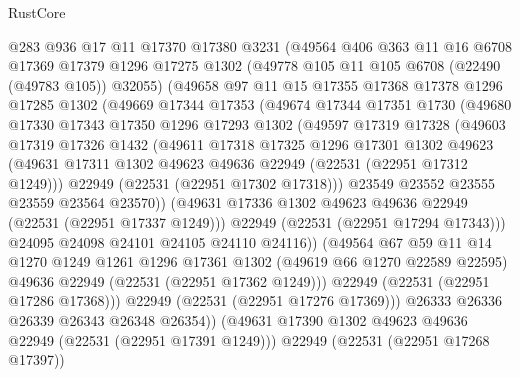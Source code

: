 \begin{lexlean}{RustCore}
\begin{coremodule}
        @283
        @936
        @17
        @11
        @17370
        @17380
        @3231
        (@49564
          @406
          @363
          @11
          @16
          @6708
          @17369
          @17379
          @1296
          @17275
          @1302
          (@49778 @105 @11 @105 @6708 (@22490 (@49783 @105)) @32055)
          (@49658
            @97
            @11
            @15
            @17355
            @17368
            @17378
            @1296
            @17285
            @1302
            (@49669
              @17344
              @17353
              (@49674
                @17344
                @17351
                @1730
                (@49680
                  @17330
                  @17343
                  @17350
                  @1296
                  @17293
                  @1302
                  (@49597
                    @17319
                    @17328
                    (@49603
                      @17319
                      @17326
                      @1432
                      (@49611
                        @17318
                        @17325
                        @1296
                        @17301
                        @1302
                        @49623
                        (@49631 @17311 @1302 @49623 @49636 @22949 (@22531 (@22951 @17312 @1249)))
                        @22949
                        (@22531 (@22951 @17302 @17318)))
                      @23549
                      @23552
                      @23555
                      @23559
                      @23564
                      @23570))
                  (@49631 @17336 @1302 @49623 @49636 @22949 (@22531 (@22951 @17337 @1249)))
                  @22949
                  (@22531 (@22951 @17294 @17343)))
                @24095
                @24098
                @24101
                @24105
                @24110
                @24116))
            (@49564
              @67
              @59
              @11
              @14
              @1270
              @1249
              @1261
              @1296
              @17361
              @1302
              (@49619 @66 @1270 @22589 @22595)
              @49636
              @22949
              (@22531 (@22951 @17362 @1249)))
            @22949
            (@22531 (@22951 @17286 @17368)))
          @22949
          (@22531 (@22951 @17276 @17369)))
        @26333
        @26336
        @26339
        @26343
        @26348
        @26354))
    (@49631 @17390 @1302 @49623 @49636 @22949 (@22531 (@22951 @17391 @1249)))
    @22949
    (@22531 (@22951 @17268 @17397))

\end{coremodule}
\end{lexlean}
